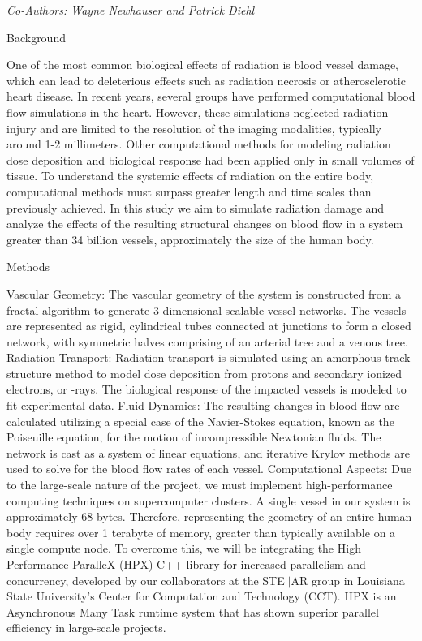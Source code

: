 \begin{center}
\textit{Co-Authors: Wayne	Newhauser and Patrick Diehl }
\end{center} 
\begin{center}
Background
\end{center}
One of the most common biological effects of radiation is blood vessel damage, which can lead to deleterious effects such as radiation necrosis or atherosclerotic heart disease. In recent years, several groups have performed computational blood flow simulations in the heart. However, these simulations neglected radiation injury and are limited to the resolution of the imaging modalities, typically around 1-2 millimeters. Other computational methods for modeling radiation dose deposition and biological response had been applied only in small volumes of tissue. To understand the systemic effects of radiation on the entire body, computational methods must surpass greater length and time scales than previously achieved. In this study we aim to simulate radiation damage and analyze the effects of the resulting structural changes on blood flow in a system greater than 34 billion vessels, approximately the size of the human body.

\begin{center}
Methods
\end{center}
Vascular Geometry: The vascular geometry of the system is constructed from a fractal algorithm to generate 3-dimensional scalable vessel networks. The vessels are represented as rigid, cylindrical tubes connected at junctions to form a closed network, with symmetric halves comprising of an arterial tree and a venous tree.
Radiation Transport: Radiation transport is simulated using an amorphous track-structure method to model dose deposition from protons and secondary ionized electrons, or -rays. The biological response of the impacted vessels is modeled to fit experimental data.
Fluid Dynamics: The resulting changes in blood flow are calculated utilizing a special case of the Navier-Stokes equation, known as the Poiseuille equation, for the motion of incompressible Newtonian fluids. The network is cast as a system of linear equations, and iterative Krylov methods are used to solve for the blood flow rates of each vessel.
Computational Aspects: Due to the large-scale nature of the project, we must implement high-performance computing techniques on supercomputer clusters. A single vessel in our system is approximately 68 bytes. Therefore, representing the geometry of an entire human body requires over 1 terabyte of memory, greater than typically available on a single compute node.
To overcome this, we will be integrating the High Performance ParalleX (HPX) C++ library for increased parallelism and concurrency, developed by our collaborators at the STE$\vert\vert$AR group in Louisiana State University’s Center for Computation and Technology (CCT). HPX is an Asynchronous Many Task runtime system that has shown superior parallel efficiency in large-scale projects.

